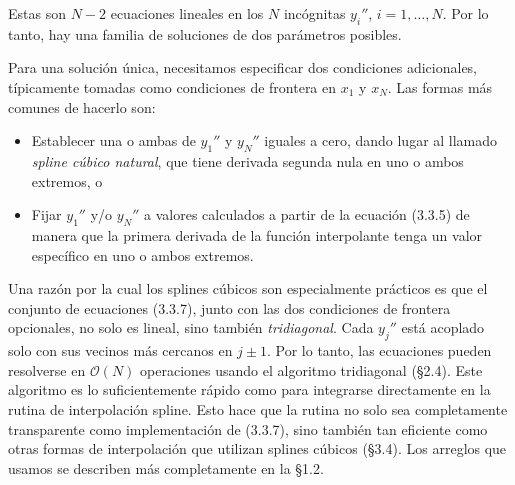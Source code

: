 \documentclass[10pt,a4paper]{book}
\begin{document}
Estas son \( N - 2 \) ecuaciones lineales en los \( N \) incógnitas \( y_i'' \), \( i = 1, \dots, N \). Por lo tanto, hay una familia de soluciones de dos parámetros posibles.

Para una solución única, necesitamos especificar dos condiciones adicionales, típicamente tomadas como condiciones de frontera en \( x_1 \) y \( x_N \). Las formas más comunes de hacerlo son:

\begin{itemize}
  \item Establecer una o ambas de \( y_1'' \) y \( y_N'' \) iguales a cero, dando lugar al llamado \textit{spline cúbico natural}, que tiene derivada segunda nula en uno o ambos extremos, o
  \item Fijar \( y_1'' \) y/o \( y_N'' \) a valores calculados a partir de la ecuación (3.3.5) de manera que la primera derivada de la función interpolante tenga un valor específico en uno o ambos extremos.
\end{itemize}

Una razón por la cual los splines cúbicos son especialmente prácticos es que el conjunto de ecuaciones (3.3.7), junto con las dos condiciones de frontera opcionales, no solo es lineal, sino también \textit{tridiagonal}. Cada \( y_j'' \) está acoplado solo con sus vecinos más cercanos en \( j \pm 1 \). Por lo tanto, las ecuaciones pueden resolverse en \( \mathcal{O}(N) \) operaciones usando el algoritmo tridiagonal (§2.4). Este algoritmo es lo suficientemente rápido como para integrarse directamente en la rutina de interpolación spline. Esto hace que la rutina no solo sea completamente transparente como implementación de (3.3.7), sino también tan eficiente como otras formas de interpolación que utilizan splines cúbicos (§3.4). Los arreglos que usamos se describen más completamente en la §1.2.
\end{document}
